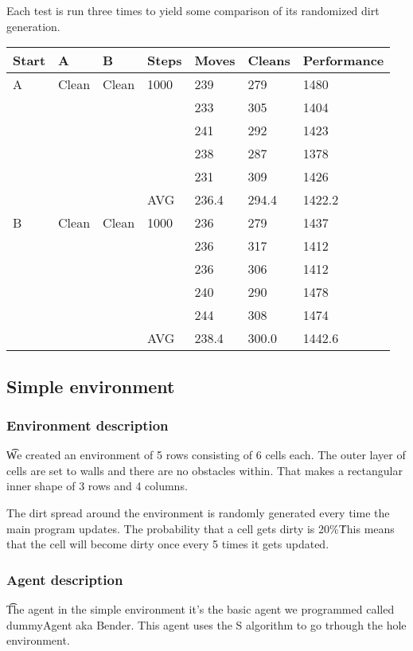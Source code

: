 Each test is run three times to yield some comparison of its randomized dirt
generation.

\begin{longtable}{p{} p{} p{} 
									p{} p{} p{} 
									p{}}
Start	& A & B & Steps & Moves & Cleans & Performance \\\hline
A & Clean & Clean & 1000 
		 & 239 & 279 & 1480 \\
	&&&& 233 & 305 & 1404 \\
	&&&& 241 & 292 & 1423 \\
	&&&& 238 & 287 & 1378 \\
	&&&& 231 & 309 & 1426 \\\hline
  &&& AVG & 236.4 & 294.4 & 1422.2\\\hline

B & Clean & Clean & 1000 
		 & 236 & 279 & 1437 \\
	&&&& 236 & 317 & 1412 \\
	&&&& 236 & 306 & 1412 \\
	&&&& 240 & 290 & 1478 \\
	&&&& 244 & 308 & 1474 \\\hline
  &&& AVG & 238.4 & 300.0 & 1442.6 \\\hline
\end{longtable}

\subsection{Simple environment}
\subsubsection{Environment description}\label{sec:SimpleEnvDesc}
\t We created an environment of 5 rows consisting of 6 cells each. The outer layer of
cells are set to walls and there are no obstacles within. That makes a rectangular
inner shape of 3 rows and 4 columns. 

The dirt spread around the environment is randomly generated every time the main
program updates. The probability that a cell gets dirty is 20\%\. This means that the
cell will become dirty once every 5 times it gets updated.


\subsubsection{Agent description}
\t The agent in the simple environment it's the basic agent we programmed called
dummyAgent aka Bender. This agent uses the S algorithm to go trhough the hole
environment.

